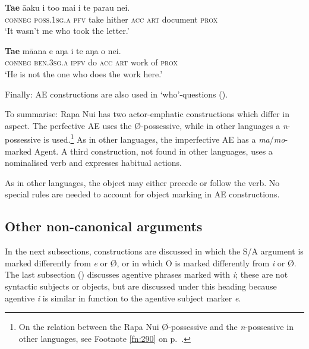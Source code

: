 \ea\label{ex:8.108}
\gll \textbf{Ta{\ꞌ}e} {\ꞌ}ā{\ꞌ}aku i to{\ꞌ}o mai i te parau nei.\\
\textsc{conneg} \textsc{poss.1sg.a} \textsc{pfv} take hither \textsc{acc} \textsc{art} document \textsc{prox}\\

\glt 
‘It wasn’t me who took the letter.’ \textstyleExampleref{[Egt-02.336]}
\z

\ea\label{ex:8.109}
\gll \textbf{Ta{\ꞌ}e} mā{\ꞌ}ana e aŋa i te aŋa o nei. \\
\textsc{conneg} \textsc{ben.3sg.a} \textsc{ipfv} do \textsc{acc} \textsc{art} work of \textsc{prox} \\

\glt
‘He is not the one who does the work here.’ \textstyleExampleref{[R229.462]} 
\z

Finally: AE constructions are also used in ‘who’-questions ().

To summarise: Rapa Nui has two actor-emphatic constructions which differ in aspect. The perfective AE uses the Ø-possessive, while in other languages a \textit{n}{}-possessive is used.\footnote{\label{fn:431}On the relation between the Rapa Nui Ø-possessive and the \textit{n}{}-possessive in other languages, see Footnote \ref{fn:290} on p.~\pageref{fn:290}.} As in other languages, the imperfective AE has a \textit{ma}/\textit{mo}{}-marked Agent. A third construction, not found in other languages, uses a nominalised verb and expresses habitual actions. 

As in other languages, the object may either precede or follow the verb. No special rules are needed to account for object marking in AE constructions. 
\subsection{Other non-canonical arguments}\label{sec:8.6.4}

In the next subsections, constructions are discussed in which the S/A argument is marked differently from \textit{e} or Ø, or in which O is marked differently from \textit{i} or Ø. The last subsection () discusses agentive phrases marked with \textit{i}; these are not syntactic subjects or objects, but are discussed under this heading because agentive \textit{i} is similar in function to the agentive subject marker \textit{e}.

